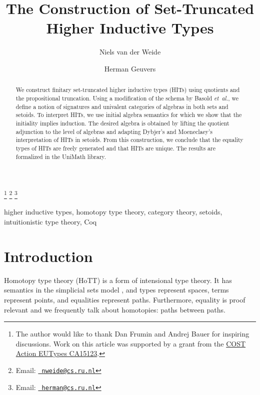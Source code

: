 \documentclass[9pt]{entcs}
\newcommand{\etal}{\emph{et~al.}}
\newcommand{\0}{\textbf{0}} %
\begin{document}
\begin{frontmatter}
  \title{The Construction of Set-Truncated Higher Inductive Types} \author{Niels van der Weide
		}
  \address{Institute for Computation and Information Sciences\\ Radboud Universiteit\\
  	Nijmegen, The Netherlands}
  \author{Herman Geuvers}
  \address{Institute for Computation and Information Sciences\\ Radboud Universiteit\\
  	Nijmegen, The Netherlands}
  \thanks[ALL]{The author would like to thank Dan Frumin and Andrej Bauer for inspiring discussions. Work on this article was supported by a grant from the \href{https://eutypes.cs.ru.nl/}{COST Action EUTypes CA15123}.} \thanks[myemail]{Email:
  	\href{mailto:nweide@cs.ru.nl} {\texttt{\normalshape
  			nweide@cs.ru.nl}}} \thanks[coemail]{Email:
  	\href{mailto:herman@cs.ru.nl} {\texttt{\normalshape
  			herman@cs.ru.nl}}}
\begin{abstract} 
  We construct finitary set-truncated higher inductive types (HITs) using quotients and the propositional truncation.
  Using a modification of the schema by Basold \etal, we define a notion of signatures and univalent categories of algebras in both sets and setoids.
  To interpret HITs, we use initial algebra semantics for which we show that the initiality implies induction.
  The desired algebra is obtained by lifting the quotient adjunction to the level of algebras and adapting Dybjer's and Moeneclaey's interpretation of HITs in setoids.
  From this construction, we conclude that the equality types of HITs are freely generated and that HITs are unique.
  The results are formalized in the UniMath library.
\end{abstract}
\begin{keyword}
higher inductive types, homotopy type theory, category theory, setoids, intuitionistic type theory, Coq
\end{keyword}
\end{frontmatter}
\section{Introduction}
\label{intro}
Homotopy type theory (HoTT) is a form of intensional type theory. 
It has semantics in the simplicial sets model \cite{simpset}, and types represent spaces, terms represent points, and equalities represent paths.
Furthermore, equality is proof relevant and we frequently talk about homotopies: paths between paths.
\end{document}
